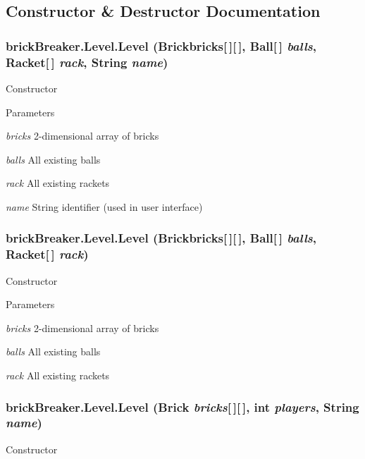 \subsection{Constructor \& Destructor Documentation}
\hypertarget{classbrick_breaker_1_1_level_ac98f98fe72c9000911b79fabd548e44e}{
\subsubsection[{Level}]{\setlength{\rightskip}{0pt plus 5cm}brickBreaker.Level.Level (Brickbricks\mbox{[}$\,$\mbox{]}\mbox{[}$\,$\mbox{]}, \/  {\bf Ball}\mbox{[}$\,$\mbox{]} {\em balls}, \/  {\bf Racket}\mbox{[}$\,$\mbox{]} {\em rack}, \/  String {\em name})}}
\label{classbrick_breaker_1_1_level_ac98f98fe72c9000911b79fabd548e44e}
Constructor


\begin{DoxyParams}{Parameters}
\item[{\em bricks}]2-\/dimensional array of bricks \item[{\em balls}]All existing balls \item[{\em rack}]All existing rackets \item[{\em name}]String identifier (used in user interface) \end{DoxyParams}
\hypertarget{classbrick_breaker_1_1_level_aa88640ad04ca2a8b471be22a39bd2f75}{
\subsubsection[{Level}]{\setlength{\rightskip}{0pt plus 5cm}brickBreaker.Level.Level (Brickbricks\mbox{[}$\,$\mbox{]}\mbox{[}$\,$\mbox{]}, \/  {\bf Ball}\mbox{[}$\,$\mbox{]} {\em balls}, \/  {\bf Racket}\mbox{[}$\,$\mbox{]} {\em rack})}}
\label{classbrick_breaker_1_1_level_aa88640ad04ca2a8b471be22a39bd2f75}
Constructor


\begin{DoxyParams}{Parameters}
\item[{\em bricks}]2-\/dimensional array of bricks \item[{\em balls}]All existing balls \item[{\em rack}]All existing rackets \end{DoxyParams}
\hypertarget{classbrick_breaker_1_1_level_ab814f5c562c5703aedf3569501b44845}{
\subsubsection[{Level}]{\setlength{\rightskip}{0pt plus 5cm}brickBreaker.Level.Level ({\bf Brick} {\em bricks}\mbox{[}$\,$\mbox{]}\mbox{[}$\,$\mbox{]}, \/  int {\em players}, \/  String {\em name})}}
\label{classbrick_breaker_1_1_level_ab814f5c562c5703aedf3569501b44845}
Constructor


